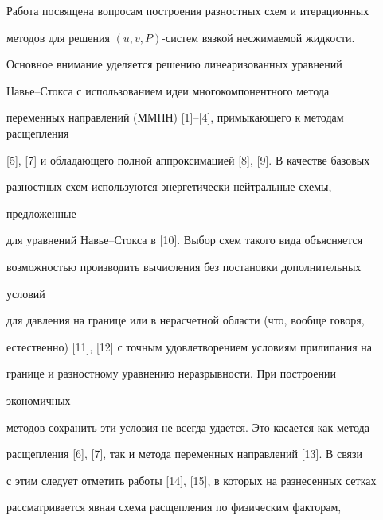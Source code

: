 \date{}




\pagestyle{plain} %







\maketitle


\label{begin}





Работа посвящена вопросам построения разностных схем и итерационных


методов для решения $(u,v,P)$-систем вязкой несжимаемой жидкости.


Основное внимание уделяется решению линеаризованных уравнений


Навье--Стокса с использованием идеи многокомпонентного метода


переменных направлений (ММПН) [1]--[4], примыкающего к методам расщепления


[5], [7] и обладающего полной аппроксимацией [8], [9]. В качестве базовых


разностных схем используются энергетически нейтральные схемы,


предложенные


для уравнений Навье--Стокса в [10]. Выбор схем такого вида объясняется


возможностью производить вычисления без постановки дополнительных


условий


для давления на границе или в нерасчетной области (что, вообще говоря,


естественно) [11], [12] с точным удовлетворением условиям прилипания на


границе и разностному уравнению неразрывности. При построении


экономичных


методов сохранить эти условия не всегда удается. Это касается как метода


расщепления [6], [7], так и метода переменных направлений [13]. В связи


с этим следует отметить работы [14], [15], в которых на разнесенных сетках


рассматривается явная схема расщепления по физическим факторам,


